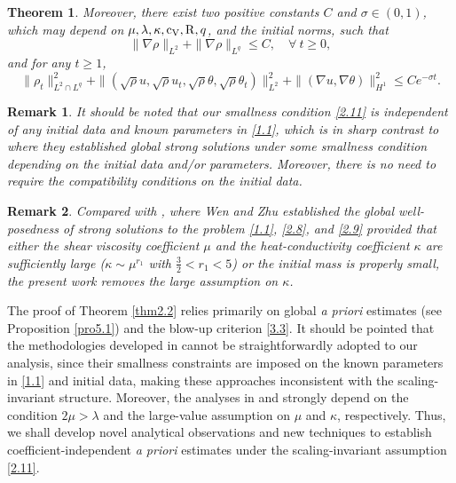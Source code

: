 \documentclass[11pt]{article}
\newtheorem{Theorem}{Theorem}[section]
\newtheorem{Remark}{Remark}[section]
\begin{document}
\begin{Theorem}
Moreover, there exist two positive constants $C$ and $\sigma \in (0,1)$, which may depend on $\mu, \lambda, \kappa, {\rm c_V}, {\rm R}, q$, and the initial norms, such that
\begin{equation}\label{2.14}
\|\nabla \rho\|_{L^2} + \|\nabla \rho\|_{L^q}  \leq C,\quad \forall \ t\geq0,
\end{equation}
and for any $t \geq 1$,
\begin{equation}\label{2.15}
\|\rho_t\|_{L^2\cap L^q}^2 + \|(\sqrt \rho u,  \sqrt \rho u_t,\sqrt \rho \theta , \sqrt \rho \theta _t)\|_{L^2}^2 + \|(\nabla u, \nabla \theta )\|_{H^1}^2 \leq C e^{-\sigma t}.
\end{equation}
\end{Theorem}

\begin{Remark}
It should be noted that our smallness condition \eqref{2.11} is independent of any initial data and known parameters in \eqref{1.1}, which is in sharp contrast to \cite{L21,HL2018,WZ2017,Li2020,W2025,LXZ2022} where they established global strong solutions under some smallness condition depending on the initial data and/or parameters. Moreover, there is no need to require the compatibility conditions on the initial data.
\end{Remark}


\begin{Remark}
Compared with \cite{WZ2017}, where Wen and Zhu established the global well-posedness of strong solutions to the problem \eqref{1.1}, \eqref{2.8}, and \eqref{2.9} provided that either the shear viscosity coefficient $\mu$ and the heat-conductivity coefficient $\kappa$ are sufficiently large ($\kappa \sim \mu^{r_1}$ with $\frac{3}{2} < r_1 < 5$) or the initial mass is properly small, the present work removes the large assumption on $\kappa$.
\end{Remark}

The proof of Theorem \ref{thm2.2} relies primarily on global {\it a priori} estimates (see Proposition \ref{pro5.1}) and the blow-up criterion \eqref{3.3}.
It should be pointed that the methodologies developed in \cite{LXZ2022,L21,WZ2017,HL2018} cannot be straightforwardly adopted to our analysis, since their smallness constraints are imposed on the known parameters in \eqref{1.1} and initial data, making these approaches inconsistent with the scaling-invariant structure.
Moreover, the analyses in \cite{Li2020} and \cite{WZ2017} strongly depend on the condition $2 \mu > \lambda$ and the large-value assumption on $\mu$ and $\kappa$, respectively. Thus, we shall develop novel analytical observations and new techniques
to establish coefficient-independent {\it a priori} estimates under the scaling-invariant assumption \eqref{2.11}.
\end{document}
